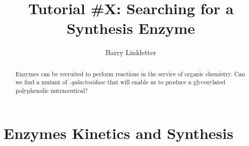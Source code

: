 \documentclass[]{tufte-handout}
\title{Tutorial \#X: Searching for a Synthesis Enzyme}
\author[Barry Linkletter]{Barry Linkletter}
\date{} %
\begin{document}
\justifying


\maketitle%

\begin{abstract}
\noindent Enzymes can be recruited to perform reactions in the service of organic chem\-istry. Can we find a mutant of  \emph{\textbeta -galactosidase} that will enable us to produce a gly\-cos\-yl\-at\-ed polyphenolic nutraceutical?

\end{abstract}





\section{Enzymes Kinetics and Synthesis}
\end{document}

